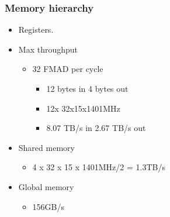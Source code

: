 \documentclass{beamer}
\begin{document}
\begin{frame}
\frametitle{Memory hierarchy}
\begin{itemize}
\item Registers. 
\item Max throughput
\begin{itemize}
\item 32 FMAD per cycle
\begin{itemize}
\item 12 bytes in 4 bytes out
\item 12x 32x15x1401MHz
\item 8.07 TB/s in 2.67 TB/s out
\end{itemize}
\end{itemize}
\item Shared memory
\begin{itemize}
\item 4 x 32 x 15 x 1401MHz/2 = 1.3TB/s
\end{itemize}
\item Global memory
\begin{itemize}
\item 156GB/s
\end{itemize}
\end{itemize}

\end{frame}
\end{document}
